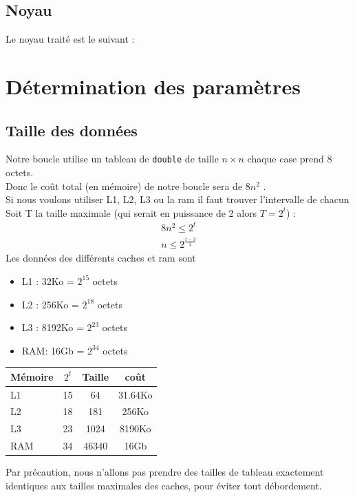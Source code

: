 \documentclass{report}
\begin{document}
  \subsection{Noyau}
  Le noyau traité est le suivant :
    

\newpage
\section{Détermination des paramètres}
  \subsection{Taille des données}
    Notre boucle utilise un tableau de \texttt{double} de taille $n\times n$
    chaque case prend 8 octets. \\
    Donc le coût total (en mémoire) de notre boucle sera de $8n^2$ . \\

    Si nous voulons utiliser L1, L2, L3 ou la ram il faut trouver l'intervalle de chacun
    Soit T la taille maximale (qui serait en puissance de 2 alors $T=2^t$) :
    \begin{align}
      8n^2 \leq 2^t \\
      n \leq 2^{\frac{t-3}{2}}
    \end{align}
    Les données des différents caches et ram sont
    \begin{itemize}
      \item L1 : 32Ko   = $2^{15}$ octets
      \item L2 : 256Ko  = $2^{18}$ octets
      \item L3 : 8192Ko = $2^{23}$ octets
      \item RAM: 16Gb   = $2^{34}$ octets
    \end{itemize}
    \vspace{5mm}
    \begin{tabular}{|l| c | c | c|}
      \hline
      Mémoire & $2^t$ & Taille & coût \\\hline
      \hline
      L1 & 15 & 64 & 31.64Ko \\\hline
      L2 & 18 & 181 & 256Ko \\\hline
      L3 & 23 & 1024 & 8190Ko \\\hline
      RAM & 34 & 46340 & 16Gb \\\hline
    \end{tabular}

   Par précaution, nous n'allons pas prendre des tailles de tableau exactement identiques aux tailles maximales des caches, pour éviter tout débordement.
\end{document}
